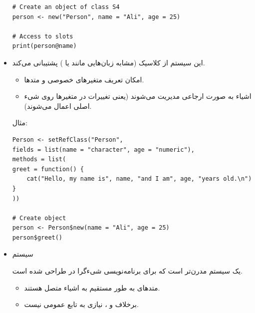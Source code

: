 \documentclass[11pt, a4paper, oneside]{book}
\begin{document}
\begin{itemize}
\begin{latin}
\begin{lstlisting}[caption={\lr{S3 OOP}}]
# Create an object of class S4
person <- new("Person", name = "Ali", age = 25)

# Access to slots
print(person@name)

		 			\end{lstlisting}
		 		\end{latin}
		 		
		 		\item {\large {}} \par
		 		
		 		این سیستم از  کلاسیک (مشابه زبان‌هایی مانند  یا ) پشتیبانی می‌کند.
		 		
		 		\begin{itemize}
		 			
		 			\item امکان تعریف متغیرهای خصوصی و متدها.
		 			
		 			\item اشیاء به صورت ارجاعی مدیریت می‌شوند (یعنی تغییرات در متغیرها روی شیء اصلی اعمال می‌شوند).
		 			
		 		\end{itemize}
		 		
		 		مثال:
		 		
		 		\begin{latin}
		 			\begin{lstlisting}[caption={\lr{Reference Classes}}] 
Person <- setRefClass("Person",
fields = list(name = "character", age = "numeric"),
methods = list(
greet = function() {
	cat("Hello, my name is", name, "and I am", age, "years old.\n")
}
))

# Create object
person <- Person$new(name = "Ali", age = 25)
person$greet()

		 			\end{lstlisting}
		 		\end{latin}
		 		
		 		\item {\large سیستم } \par
		 		
		 		یک سیستم مدرن‌تر است که برای برنامه‌نویسی شیءگرا در  طراحی شده است.
		 				 		
		 		\begin{itemize}
		 			
		 			\item متدهای  به طور مستقیم به اشیاء متصل هستند.
		 			
		 			\item برخلاف  و ، نیازی به تابع عمومی نیست.
		 			

\end{itemize}
\end{itemize}
\end{document}
